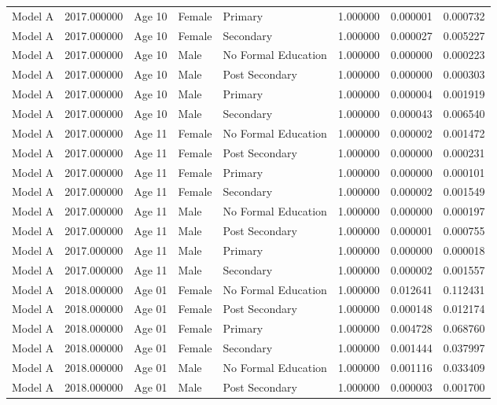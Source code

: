 \begin{table}[ht]
\begin{tabular}{lrlllrrr}
Model A & 2017.000000 & Age 10 & Female & Primary & 1.000000 & 0.000001 & 0.000732 \\
Model A & 2017.000000 & Age 10 & Female & Secondary & 1.000000 & 0.000027 & 0.005227 \\
Model A & 2017.000000 & Age 10 & Male & No Formal Education & 1.000000 & 0.000000 & 0.000223 \\
Model A & 2017.000000 & Age 10 & Male & Post Secondary & 1.000000 & 0.000000 & 0.000303 \\
Model A & 2017.000000 & Age 10 & Male & Primary & 1.000000 & 0.000004 & 0.001919 \\
Model A & 2017.000000 & Age 10 & Male & Secondary & 1.000000 & 0.000043 & 0.006540 \\
Model A & 2017.000000 & Age 11 & Female & No Formal Education & 1.000000 & 0.000002 & 0.001472 \\
Model A & 2017.000000 & Age 11 & Female & Post Secondary & 1.000000 & 0.000000 & 0.000231 \\
Model A & 2017.000000 & Age 11 & Female & Primary & 1.000000 & 0.000000 & 0.000101 \\
Model A & 2017.000000 & Age 11 & Female & Secondary & 1.000000 & 0.000002 & 0.001549 \\
Model A & 2017.000000 & Age 11 & Male & No Formal Education & 1.000000 & 0.000000 & 0.000197 \\
Model A & 2017.000000 & Age 11 & Male & Post Secondary & 1.000000 & 0.000001 & 0.000755 \\
Model A & 2017.000000 & Age 11 & Male & Primary & 1.000000 & 0.000000 & 0.000018 \\
Model A & 2017.000000 & Age 11 & Male & Secondary & 1.000000 & 0.000002 & 0.001557 \\
Model A & 2018.000000 & Age 01 & Female & No Formal Education & 1.000000 & 0.012641 & 0.112431 \\
Model A & 2018.000000 & Age 01 & Female & Post Secondary & 1.000000 & 0.000148 & 0.012174 \\
Model A & 2018.000000 & Age 01 & Female & Primary & 1.000000 & 0.004728 & 0.068760 \\
Model A & 2018.000000 & Age 01 & Female & Secondary & 1.000000 & 0.001444 & 0.037997 \\
Model A & 2018.000000 & Age 01 & Male & No Formal Education & 1.000000 & 0.001116 & 0.033409 \\
Model A & 2018.000000 & Age 01 & Male & Post Secondary & 1.000000 & 0.000003 & 0.001700 \\

\end{tabular}
\end{table}

